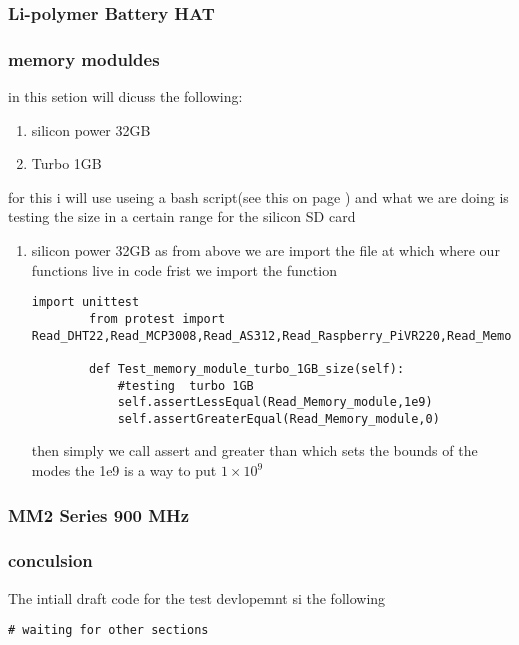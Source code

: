 \subsubsection{Li-polymer Battery HAT}

\subsubsection{memory moduldes }
in this setion will dicuss the following:
\begin{enumerate}
    \item silicon power 32GB 
    \item Turbo 1GB
\end{enumerate}
for this  i will use  useing  a  bash script(see this on page \pageref{TDD sample bash}) and what we are doing is  testing  the size in a  certain range for the silicon  SD card
\begin{enumerate}
    \item silicon power 32GB 
    as from above we are  import the file at which where our functions live in code frist we import the function
    \begin{lstlisting}[style=mystyle,caption={si powerd SD snippnet }]
        import unittest
        from protest import Read_DHT22,Read_MCP3008,Read_AS312,Read_Raspberry_PiVR220,Read_Memory_module
    
        def Test_memory_module_turbo_1GB_size(self):
            #testing  turbo 1GB
            self.assertLessEqual(Read_Memory_module,1e9)
            self.assertGreaterEqual(Read_Memory_module,0)
    \end{lstlisting}
    then simply we call assert and greater than which sets the bounds of the   modes the 1e9 is a way to put $1 × 10^9$

\end{enumerate} 
\subsubsection{MM2 Series 900 MHz}

\subsubsection{conculsion}
The  intiall  draft  code  for  the  test  devlopemnt  si the  following
\begin{lstlisting}[style=mystyle,caption={Final draft test template}]
    # waiting for other sections 
\end{lstlisting}
